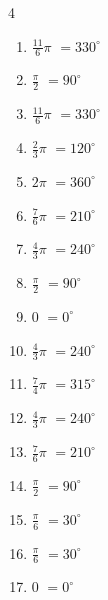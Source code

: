 \begin{multicols}{4}
\begin{enumerate}
  \item $\displaystyle \frac{11}{6}\pi$
        $\displaystyle =330^{\circ}$

  \item $\displaystyle \frac{\pi}{2}$
        $\displaystyle =90^{\circ}$

  \item $\displaystyle \frac{11}{6}\pi$
        $\displaystyle =330^{\circ}$

  \item $\displaystyle \frac{2}{3}\pi$
        $\displaystyle =120^{\circ}$

  \item $\displaystyle 2\pi$
        $\displaystyle =360^{\circ}$

  \item $\displaystyle \frac{7}{6}\pi$
        $\displaystyle =210^{\circ}$

  \item $\displaystyle \frac{4}{3}\pi$
        $\displaystyle =240^{\circ}$

  \item $\displaystyle \frac{\pi}{2}$
        $\displaystyle =90^{\circ}$

  \item $\displaystyle 0$
        $\displaystyle =0^{\circ}$

  \item $\displaystyle \frac{4}{3}\pi$
        $\displaystyle =240^{\circ}$

  \item $\displaystyle \frac{7}{4}\pi$
        $\displaystyle =315^{\circ}$

  \item $\displaystyle \frac{4}{3}\pi$
        $\displaystyle =240^{\circ}$

  \item $\displaystyle \frac{7}{6}\pi$
        $\displaystyle =210^{\circ}$

  \item $\displaystyle \frac{\pi}{2}$
        $\displaystyle =90^{\circ}$

  \item $\displaystyle \frac{\pi}{6}$
        $\displaystyle =30^{\circ}$

  \item $\displaystyle \frac{\pi}{6}$
        $\displaystyle =30^{\circ}$

  \item $\displaystyle 0$
        $\displaystyle =0^{\circ}$


\end{enumerate}
\end{multicols}
